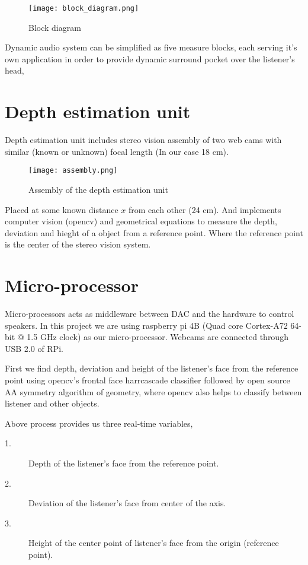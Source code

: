 \documentclass[../../../patent_v1.tex]{subfiles}
\begin{document}
\begin{figure*}
    \texttt{[image: block\_diagram.png]}
    \caption{Block diagram}
\end{figure*}

\FloatBarrier

Dynamic audio system can be simplified as five measure blocks, each serving it's
own application in order to provide dynamic surround pocket over the listener's
head,

\section{Depth estimation unit}

Depth estimation unit includes stereo vision assembly of two web cams with similar 
(known or unknown) focal length (In our case 18 cm).

\begin{figure}[h]
    \texttt{[image: assembly.png]}
    \caption{Assembly of the depth estimation unit}
\end{figure}

Placed at some known distance \(x \) from each other (24 cm). And implements
computer vision (opencv) and geometrical equations to measure the depth, deviation 
and hieght of a object from a reference point. Where the reference point is the 
center of the stereo vision system.  

\section{Micro-processor}

Micro-processors acts as middleware between DAC and the hardware to control speakers.
In this project we are using raspberry pi 4B (Quad core Cortex-A72 64-bit @ 1.5 GHz clock) 
as our micro-processor. Webcams are connected through USB 2.0 of RPi.

First we find depth, deviation and height of the listener's face from the reference point
using opencv's frontal face harrcascade classifier followed by open source AA symmetry 
algorithm of geometry, where opencv also helps to classify between listener and other objects. 

Above process provides us three real-time variables,

\begin{description}
    \item[1.]Depth of the listener's face from the reference point.
    \item[2.]Deviation of the listener's face from center of the axis.
    \item[3.]Height of the center point of listener's face from the origin (reference point).  
\end{description}
\end{document}
